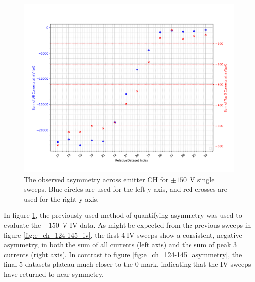 \begin{refsection}
\begin{figure}[H]
    \centering
    \includegraphics[width=\linewidth]{Chapter7/Figs/Raster/Emitters/146-159_asymmetry.png}
    \caption{The observed asymmetry across emitter CH for $\pm150$~\si{\volt} single sweeps. Blue circles are used for the left y axis, and red crosses are used for the right y axis.}
    \label{fig:e_ch_146-159_asymmetry}
\end{figure}

In figure \ref{fig:e_ch_146-159_asymmetry}, the previously used method of quantifying asymmetry was used to evaluate the $\pm150$~\si{\volt} IV data. As might be expected from the previous sweeps in figure \ref{fig:e_ch_124-145_iv}, the first 4 IV sweeps show a consistent, negative asymmetry, in both the sum of all currents (left axis) and the sum of peak 3 currents (right axis). In contrast to figure \ref{fig:e_ch_124-145_asymmetry}, the final 5 datasets plateau much closer to the 0 mark, indicating that the IV sweeps have returned to near-symmetry.


\end{refsection}
